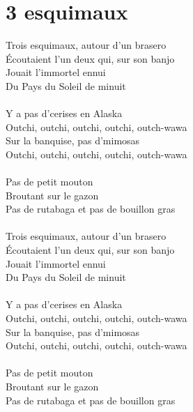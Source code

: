 \section*{3 esquimaux}
Trois esquimaux, autour d'un brasero\\
Écoutaient l'un deux qui, sur son banjo\\
Jouait l'immortel ennui\\
Du Pays du Soleil de minuit\\\\
Y a pas d'cerises en Alaska\\
Outchi, outchi, outchi, outchi, outch-wawa\\
Sur la banquise, pas d'mimosas\\
Outchi, outchi, outchi, outchi, outch-wawa\\\\
Pas de petit mouton\\
Broutant sur le gazon\\
Pas de rutabaga et pas de bouillon gras\\\\
Trois esquimaux, autour d'un brasero\\
Écoutaient l'un deux qui, sur son banjo\\
Jouait l'immortel ennui\\
Du Pays du Soleil de minuit\\\\
Y a pas d'cerises en Alaska\\
Outchi, outchi, outchi, outchi, outch-wawa\\
Sur la banquise, pas d'mimosas\\
Outchi, outchi, outchi, outchi, outch-wawa\\\\
Pas de petit mouton\\
Broutant sur le gazon\\
Pas de rutabaga et pas de bouillon gras\\
